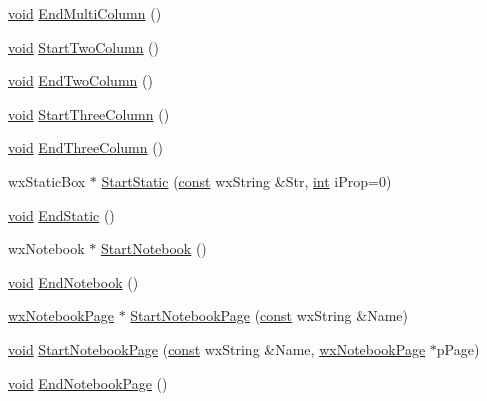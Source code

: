 \begin{DoxyCompactItemize}
\item 
\hyperlink{sound_8c_ae35f5844602719cf66324f4de2a658b3}{void} \hyperlink{class_shuttle_gui_base_a1a676a57ca191fde04599e4199e3f7f4}{End\+Multi\+Column} ()
\item 
\hyperlink{sound_8c_ae35f5844602719cf66324f4de2a658b3}{void} \hyperlink{class_shuttle_gui_base_a1714fbeb5904ba9910db1d873b845b2d}{Start\+Two\+Column} ()
\item 
\hyperlink{sound_8c_ae35f5844602719cf66324f4de2a658b3}{void} \hyperlink{class_shuttle_gui_base_a6207c474f3feb210603ad9b53ff06aad}{End\+Two\+Column} ()
\item 
\hyperlink{sound_8c_ae35f5844602719cf66324f4de2a658b3}{void} \hyperlink{class_shuttle_gui_base_a57f692f21fb424b4ca8e12cdc2056bb2}{Start\+Three\+Column} ()
\item 
\hyperlink{sound_8c_ae35f5844602719cf66324f4de2a658b3}{void} \hyperlink{class_shuttle_gui_base_a92e7c455939be0da76f5452282bf32f3}{End\+Three\+Column} ()
\item 
wx\+Static\+Box $\ast$ \hyperlink{class_shuttle_gui_base_af3077c7ec169ef519b6d7afa80ec9a64}{Start\+Static} (\hyperlink{getopt1_8c_a2c212835823e3c54a8ab6d95c652660e}{const} wx\+String \&Str, \hyperlink{xmltok_8h_a5a0d4a5641ce434f1d23533f2b2e6653}{int} i\+Prop=0)
\item 
\hyperlink{sound_8c_ae35f5844602719cf66324f4de2a658b3}{void} \hyperlink{class_shuttle_gui_base_ac6ae219c1f976c24fc88a07ffdaee4cd}{End\+Static} ()
\item 
wx\+Notebook $\ast$ \hyperlink{class_shuttle_gui_base_a3636c9684cf7202f3f91facbe672b3e5}{Start\+Notebook} ()
\item 
\hyperlink{sound_8c_ae35f5844602719cf66324f4de2a658b3}{void} \hyperlink{class_shuttle_gui_base_a07b8b5537a45b159fce0f33596f2fce5}{End\+Notebook} ()
\item 
\hyperlink{_shuttle_gui_8h_ac083c0e486431b13c824d6ad01ae7faa}{wx\+Notebook\+Page} $\ast$ \hyperlink{class_shuttle_gui_base_a38abb4d2834e948bd4a8f4a46424fc50}{Start\+Notebook\+Page} (\hyperlink{getopt1_8c_a2c212835823e3c54a8ab6d95c652660e}{const} wx\+String \&Name)
\item 
\hyperlink{sound_8c_ae35f5844602719cf66324f4de2a658b3}{void} \hyperlink{class_shuttle_gui_base_a87ddf515ab0556f9fcc3f9a55adf7c08}{Start\+Notebook\+Page} (\hyperlink{getopt1_8c_a2c212835823e3c54a8ab6d95c652660e}{const} wx\+String \&Name, \hyperlink{_shuttle_gui_8h_ac083c0e486431b13c824d6ad01ae7faa}{wx\+Notebook\+Page} $\ast$p\+Page)
\item 
\hyperlink{sound_8c_ae35f5844602719cf66324f4de2a658b3}{void} \hyperlink{class_shuttle_gui_base_a52ee053fa82b6cb8348fdb29a1f19ecd}{End\+Notebook\+Page} ()

\end{DoxyCompactItemize}
